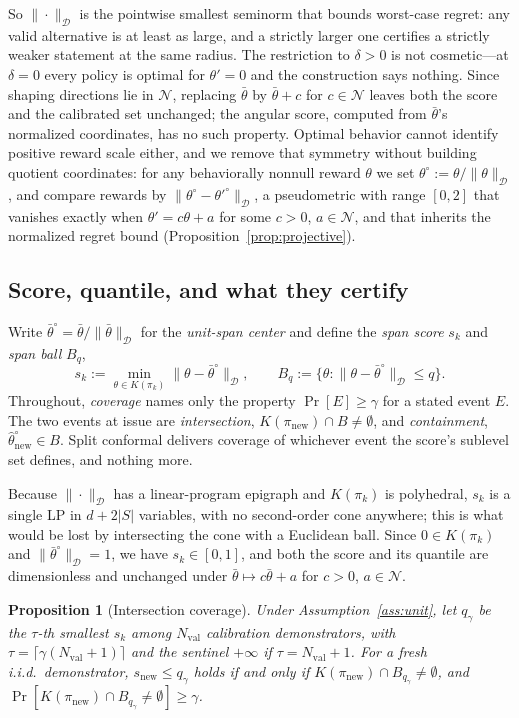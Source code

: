 \documentclass{article}
\newtheorem{proposition}{Proposition}
\newcommand{\Dnorm}[1]{\|#1\|_{\mathcal D}}
\begin{document}
So $\Dnorm{\cdot}$ is the pointwise smallest seminorm that bounds worst-case
regret: any valid alternative is at least as large, and a strictly larger one
certifies a strictly weaker statement at the same radius. The restriction to
$\delta>0$ is not cosmetic---at $\delta=0$ every policy is optimal for
$\theta'=0$ and the construction says nothing. Since shaping directions lie in $\mathcal N$, replacing $\bar\theta$ by
$\bar\theta+c$ for $c\in\mathcal N$ leaves both the score and the calibrated set
unchanged; the angular score, computed from $\bar\theta$'s normalized
coordinates, has no such property. Optimal behavior cannot identify positive
reward scale either, and we remove that symmetry without building quotient
coordinates: for any behaviorally nonnull reward $\theta$ we set
$\theta^\circ:=\theta/\Dnorm{\theta}$, and compare rewards by
$\Dnorm{\theta^\circ-\theta'^\circ}$, a pseudometric with range $[0,2]$ that
vanishes exactly when $\theta'=c\theta+a$ for some $c>0$, $a\in\mathcal N$, and
that inherits the normalized regret bound
(Proposition~\ref{prop:projective}).

\subsection{Score, quantile, and what they certify}
\label{sec:score}

Write $\bar\theta^\circ=\bar\theta/\Dnorm{\bar\theta}$ for the \emph{unit-span
center} and define the \emph{span score} $s_k$ and \emph{span ball} $B_q$,
\[
s_k:=\min_{\theta\in K(\pi_k)}\Dnorm{\theta-\bar\theta^\circ},
\qquad
B_q:=\{\theta:\Dnorm{\theta-\bar\theta^\circ}\le q\}.
\]
Throughout, \emph{coverage} names only the property $\Pr[E]\ge\gamma$ for a
stated event $E$. The two events at issue are \emph{intersection},
$K(\pi_{\mathrm{new}})\cap B\ne\emptyset$, and \emph{containment},
$\hat\theta_{\mathrm{new}}^\circ\in B$. Split conformal delivers coverage of
whichever event the score's sublevel set defines, and nothing more.

Because $\Dnorm{\cdot}$ has a linear-program epigraph and $K(\pi_k)$ is
polyhedral, $s_k$ is a single LP in $d+2|S|$ variables, with no second-order
cone anywhere; this is what would be lost by intersecting the cone with a
Euclidean ball. Since $0\in K(\pi_k)$ and $\Dnorm{\bar\theta^\circ}=1$, we have
$s_k\in[0,1]$, and both the score and its quantile are dimensionless and
unchanged under $\bar\theta\mapsto c\bar\theta+a$ for $c>0$, $a\in\mathcal N$.

\begin{proposition}[Intersection coverage]
\label{prop:da-coverage}
Under Assumption~\ref{ass:unit}, let $q_\gamma$ be the $\tau$-th smallest $s_k$
among $N_{\mathrm{val}}$ calibration demonstrators, with
$\tau=\lceil\gamma(N_{\mathrm{val}}+1)\rceil$ and the sentinel $+\infty$ if
$\tau=N_{\mathrm{val}}+1$. For a fresh i.i.d.\ demonstrator,
$s_{\mathrm{new}}\le q_\gamma$ holds if and only if
$K(\pi_{\mathrm{new}})\cap B_{q_\gamma}\ne\emptyset$, and
$\Pr[K(\pi_{\mathrm{new}})\cap B_{q_\gamma}\ne\emptyset]\ge\gamma$.
\end{proposition}
\end{document}
